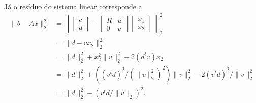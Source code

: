 \begin{questions}
\begin{solution}
        J\'{a} o res\'{i}duo do sistema linear corresponde a
        \begin{align*}
            \| b - A x \|_2^2 &= \left\| \begin{bmatrix}
                c \\
                d
            \end{bmatrix} - \begin{bmatrix}
                R & w \\
                0 & v
            \end{bmatrix} \begin{bmatrix}
                x_1 \\
                x_2
            \end{bmatrix} \right\|_2^2 \\
            &= \| d - v x_2 \|_2^2 \\
            &= \| d \|_2^2 + x_2^2 \| v \|_2^2 - 2 (d^t v) x_2 \\
            &= \| d \|_2^2 + \left( (v^t d)^2 / (\| v \|_2^2)^2 \right) \| v \|_2^2 - 2 (v^t d)^2 / \| v \|_2^2 \\
            &= \| d \|_2^2 - \left( v^t d / \| v \|_2 \right)^2.
        \end{align*}
    \end{solution}
\end{questions}

